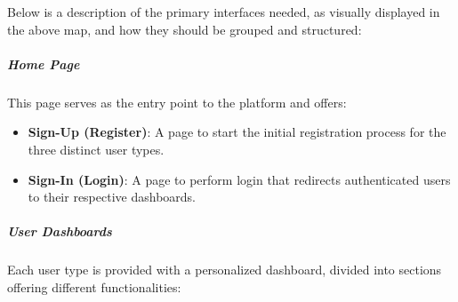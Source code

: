 Below is a description of the primary interfaces needed, as visually displayed in the above map, and how they should be grouped and structured:

\subparagraph{Home Page}
This page serves as the entry point to the platform and offers:
\begin{itemize}
    \item \textbf{Sign-Up (Register)}: A page to start the initial registration process for the three distinct user types.
    \item \textbf{Sign-In (Login)}: A page to perform login that redirects authenticated users to their respective dashboards.
\end{itemize}

\subparagraph{User Dashboards}
Each user type is provided with a personalized dashboard, divided into sections offering different functionalities:

